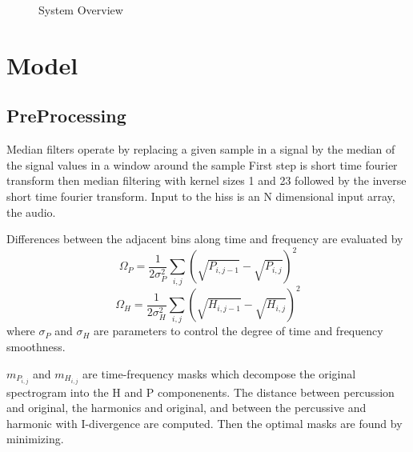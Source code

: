 \documentclass{article}
\begin{document}
\begin{figure}
\caption{System Overview}
\label{fig:overview}
\end{figure}

\section{Model}

\subsection{PreProcessing}
Median filters operate by replacing a given sample in a signal by the median of the signal values in a window around the
sample \cite{FitzGerald:11} First step is short time fourier transform then median filtering with kernel sizes 1 and 23
followed by the inverse short time fourier transform. Input to the hiss is an N dimensional input array, the audio.

Differences between the adjacent bins along time and frequency are evaluated by
$$\Omega_{P} = \frac{1}{2\sigma ^{2}_{P}} \sum_{i,j} (\sqrt{P_{i,j-1}}-\sqrt{P_{i,j}})^{2}$$
$$\Omega_{H} = \frac{1}{2\sigma ^{2}_{H}} \sum_{i,j} (\sqrt{H_{i,j-1}}-\sqrt{H_{i,j}})^{2}$$
where $\sigma_{P}$ and $\sigma_{H}$ are parameters to control the degree of time and frequency
smoothness.

$m_{P_{i,j}}$ and $m_{H_{i,j}}$ are time-frequency masks which decompose the original
spectrogram into the H and P componenents. The distance between percussion and
original, the harmonics and original, and between the percussive and harmonic with
I-divergence are computed. Then the optimal masks are found by minimizing.
\end{document}
